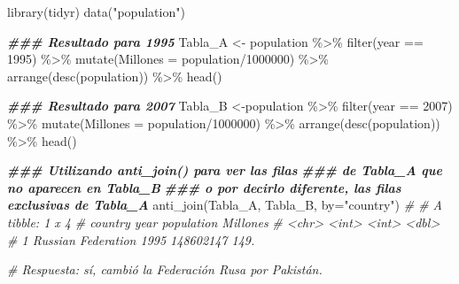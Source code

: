 \documentclass[
]{article}
\newenvironment{Shaded}{\begin{snugshade}}{\end{snugshade}}
\newcommand{\AttributeTok}[1]{\textcolor[rgb]{0.77,0.63,0.00}{#1}}
\newcommand{\CommentTok}[1]{\textcolor[rgb]{0.56,0.35,0.01}{\textit{#1}}}
\newcommand{\DecValTok}[1]{\textcolor[rgb]{0.00,0.00,0.81}{#1}}
\newcommand{\DocumentationTok}[1]{\textcolor[rgb]{0.56,0.35,0.01}{\textbf{\textit{#1}}}}
\newcommand{\FunctionTok}[1]{\textcolor[rgb]{0.00,0.00,0.00}{#1}}
\newcommand{\NormalTok}[1]{#1}
\newcommand{\OtherTok}[1]{\textcolor[rgb]{0.56,0.35,0.01}{#1}}
\newcommand{\SpecialCharTok}[1]{\textcolor[rgb]{0.00,0.00,0.00}{#1}}
\newcommand{\StringTok}[1]{\textcolor[rgb]{0.31,0.60,0.02}{#1}}
\theoremstyle{definition}
\theoremstyle{definition}
\theoremstyle{definition}
\theoremstyle{definition}
\theoremstyle{remark}
\begin{document}
\begin{Shaded}
\begin{Highlighting}[]
\FunctionTok{library}\NormalTok{(tidyr)}
\FunctionTok{data}\NormalTok{(}\StringTok{"population"}\NormalTok{)}

\DocumentationTok{\#\#\# Resultado para 1995}
\NormalTok{Tabla\_A }\OtherTok{\textless{}{-}}\NormalTok{ population }\SpecialCharTok{\%\textgreater{}\%} 
  \FunctionTok{filter}\NormalTok{(year }\SpecialCharTok{==} \DecValTok{1995}\NormalTok{) }\SpecialCharTok{\%\textgreater{}\%}
  \FunctionTok{mutate}\NormalTok{(}\AttributeTok{Millones =}\NormalTok{ population}\SpecialCharTok{/}\DecValTok{1000000}\NormalTok{) }\SpecialCharTok{\%\textgreater{}\%} 
  \FunctionTok{arrange}\NormalTok{(}\FunctionTok{desc}\NormalTok{(population)) }\SpecialCharTok{\%\textgreater{}\%} 
  \FunctionTok{head}\NormalTok{()}

\DocumentationTok{\#\#\# Resultado para 2007}
\NormalTok{Tabla\_B }\OtherTok{\textless{}{-}}\NormalTok{population }\SpecialCharTok{\%\textgreater{}\%} 
  \FunctionTok{filter}\NormalTok{(year }\SpecialCharTok{==} \DecValTok{2007}\NormalTok{) }\SpecialCharTok{\%\textgreater{}\%}
  \FunctionTok{mutate}\NormalTok{(}\AttributeTok{Millones =}\NormalTok{ population}\SpecialCharTok{/}\DecValTok{1000000}\NormalTok{) }\SpecialCharTok{\%\textgreater{}\%} 
  \FunctionTok{arrange}\NormalTok{(}\FunctionTok{desc}\NormalTok{(population)) }\SpecialCharTok{\%\textgreater{}\%} 
  \FunctionTok{head}\NormalTok{()}

\DocumentationTok{\#\#\# Utilizando anti\_join() para ver las filas}
\DocumentationTok{\#\#\# de Tabla\_A que no aparecen en Tabla\_B}
\DocumentationTok{\#\#\# o por decirlo diferente, las filas exclusivas de Tabla\_A}
\FunctionTok{anti\_join}\NormalTok{(Tabla\_A, Tabla\_B, }\AttributeTok{by=}\StringTok{"country"}\NormalTok{)}
\CommentTok{\# \# A tibble: 1 x 4}
\CommentTok{\#   country             year population Millones}
\CommentTok{\#   \textless{}chr\textgreater{}              \textless{}int\textgreater{}      \textless{}int\textgreater{}    \textless{}dbl\textgreater{}}
\CommentTok{\# 1 Russian Federation  1995  148602147     149.}

\CommentTok{\# Respuesta: sí, cambió la Federación Rusa por Pakistán.}
\end{Highlighting}
\end{Shaded}
\end{document}
